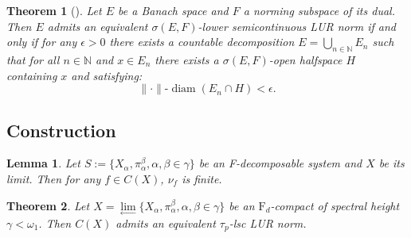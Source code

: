 \documentclass[10pt,a4paper]{amsart}
\newtheorem{theorem}{Theorem}
\newtheorem{lemma}{Lemma}
\newcommand{\N}{\mathbb{N}}
\DeclareMathOperator{\diam}{diam}
\begin{document}
\begin{theorem}[\cite{mot97}]\label{LUR_char}
	Let $E$ be a Banach space and $F$ a norming subspace of its dual. Then $E$ admits an equivalent $\sigma(E,F)$-lower semicontinuous LUR norm if and only if for any $\epsilon >0$ there exists a countable decomposition $E = \bigcup_{n \in \N} E_n$ such that for all $n \in \N$ and $x \in E_n$ there exists a $\sigma(E,F)$-open halfspace $H$ containing $x$ and satisfying:
	\begin{equation*}
		\|\cdot\| \text{-} \diam \left(E_n \cap H \right) < \epsilon.
	\end{equation*}
\end{theorem}

\subsection{Construction} \label{constr}

\begin{lemma} \label{finite_branching}
	Let $S:= \{X_\alpha, \pi_\alpha^\beta, \alpha, \beta \in \gamma\}$ be an F-decomposable system and $X$ be its limit. Then for any $f \in C(X)$,  $\nu_f$ is finite.
\end{lemma}

\begin{theorem}\label{main_thm}
	Let $X = \lim\limits_{\leftarrow} \{X_\alpha, \pi_\alpha^\beta, \alpha, \beta \in \gamma\}$ be an $\mathrm{F}_d$-compact of spectral height $\gamma < \omega_1$. Then $C(X)$ admits an equivalent $\tau_p$-lsc LUR norm.
\end{theorem} 
\end{document}
